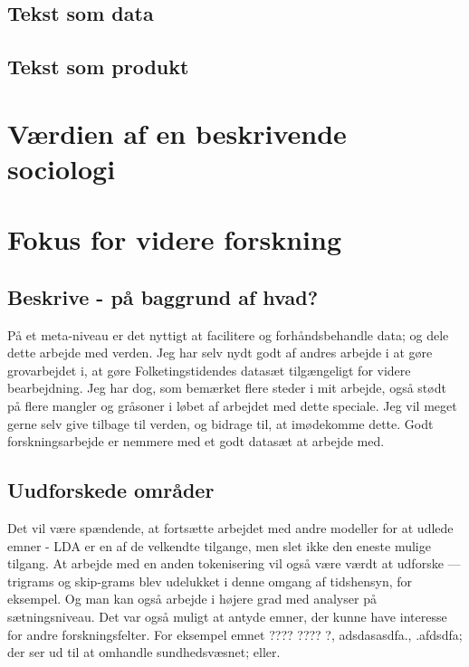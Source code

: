 \section{Tekst som data}

\section{Tekst som produkt}

\chapter{Værdien af en beskrivende sociologi}

\chapter{Fokus for videre forskning}

\section{Beskrive - på baggrund af hvad?}
På et meta-niveau er det nyttigt at facilitere og forhåndsbehandle data; og dele dette arbejde med verden.
Jeg har selv nydt godt af andres arbejde i at gøre grovarbejdet i, at gøre Folketingstidendes datasæt tilgængeligt for videre bearbejdning.
Jeg har dog, som bemærket flere steder i mit arbejde, også stødt på flere mangler og gråsoner i løbet af arbejdet med dette speciale.
Jeg vil meget gerne selv give tilbage til verden, og bidrage til, at imødekomme dette.
Godt forskningsarbejde er nemmere med et godt datasæt at arbejde med.

\section{Uudforskede områder}

Det vil være spændende, at fortsætte arbejdet med andre modeller for at udlede emner - LDA er en af de velkendte tilgange, men slet ikke den eneste mulige tilgang.
At arbejde med en anden tokenisering vil også være værdt at udforske — trigrams og skip-grams blev udelukket i denne omgang af tidshensyn, for eksempel. Og man kan også arbejde i højere grad med analyser på sætningsniveau.
Det var også muligt at antyde emner, der kunne have interesse for andre forskningsfelter.
For eksempel emnet ???? ???? ?, adsdasasdfa., .afdsdfa; der ser ud til at omhandle sundhedsvæsnet; eller.
